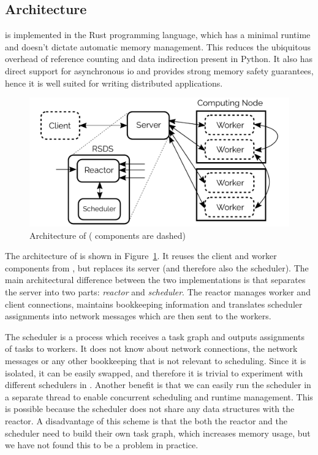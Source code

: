 \subsection*{Architecture}
\rsds{} is implemented in the Rust programming language, which has a minimal
runtime and doesn't dictate automatic memory management. This reduces the ubiquitous overhead of
reference counting and data indirection present in Python. It also has direct support for
asynchronous \gls{io} and provides strong memory safety guarantees, hence it is
well suited for writing distributed applications.

\begin{figure}
	\centering
	\includegraphics[width=0.8\linewidth]{./imgs/rsds/rsds-architecture}
	\caption{Architecture of \rsds{} (\dask{} components are dashed)}
	\label{fig:rsds-architecture}
\end{figure}

The architecture of \rsds{} is shown in Figure~\ref{fig:rsds-architecture}. It
reuses the client and worker components from \dask{}, but replaces its server
(and therefore also the scheduler). The main architectural difference between the two
implementations is that \rsds{} separates the server into two parts:
\emph{reactor} and \emph{scheduler}. The reactor manages worker and client
connections, maintains bookkeeping information and translates scheduler assignments into
\dask{} network messages which are then sent to the workers.

The scheduler is a process which receives a task graph and outputs assignments of tasks to workers.
It does not know about network connections, the \dask{} network messages or any
other bookkeeping that is not relevant to scheduling. Since it is isolated, it can be easily
swapped, and therefore it is trivial to experiment with different schedulers in
\rsds{}. Another benefit is that we can easily run the scheduler in a separate
thread to enable concurrent scheduling and runtime management. This is possible because the
scheduler does not share any data structures with the reactor. A disadvantage of this scheme is
that the both the reactor and the scheduler need to build their own task graph, which increases
memory usage, but we have not found this to be a problem in practice.

